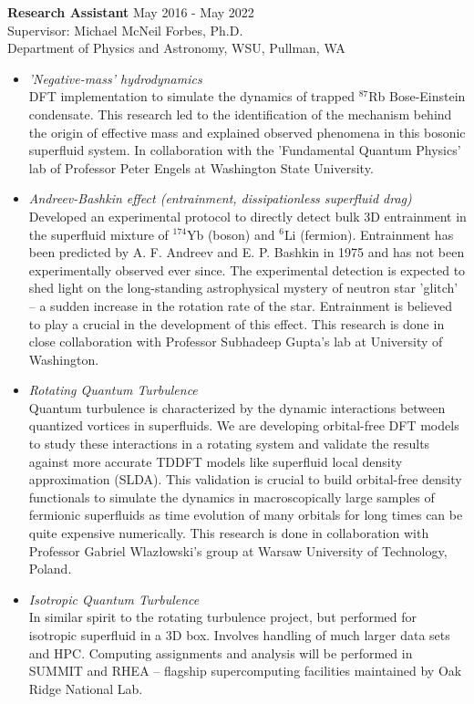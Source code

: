 \documentclass[10pt,fleqn]{scrartcl}
\begin{document}
\noindent
\textbf{Research Assistant}   \hfill May 2016 - May 2022 \\ 
Supervisor: Michael McNeil Forbes, Ph.D. \\
Department of Physics and Astronomy, WSU, Pullman, WA
\begin{itemize}
  \item \textit{'Negative-mass' hydrodynamics}\\
  		DFT implementation to simulate the dynamics of trapped $^{87}$Rb 
        Bose-Einstein condensate. This research led to the identification of 
        the mechanism behind the origin of effective mass and explained 
        observed phenomena in this bosonic superfluid system. In collaboration 
        with the 'Fundamental Quantum Physics' lab of Professor Peter Engels 
        at Washington State University. 
  \item \textit{Andreev-Bashkin effect (entrainment, dissipationless 
    superfluid drag)}\\
  		Developed an experimental protocol to directly detect bulk 3D 
        entrainment in the superfluid mixture of $^{174}$Yb (boson) and 
        $^{6}$Li (fermion). Entrainment has been predicted by A. F. Andreev 
        and E. P. Bashkin in 1975 and has not been experimentally observed ever 
        since. The experimental detection is expected to shed light on the 
        long-standing astrophysical mystery of neutron star 'glitch' -- 
        a sudden increase in the rotation rate of the star. Entrainment is 
        believed to play a crucial in the development of this effect. 
        This research is done in close collaboration with Professor Subhadeep 
        Gupta's lab at University of Washington.
  \item \textit{Rotating Quantum Turbulence}\\
  		Quantum turbulence is characterized by the dynamic interactions between 
        quantized vortices in superfluids. We are developing orbital-free DFT 
        models to study these interactions in a rotating system and validate 
        the results against more accurate TDDFT models like superfluid local 
        density approximation (SLDA). This validation is crucial to build 
        orbital-free density functionals to simulate the dynamics in 
        macroscopically large samples of fermionic superfluids as time 
        evolution of many orbitals for long times can be quite expensive 
        numerically. This research is done in collaboration with Professor 
        Gabriel Wlazłowski's group at Warsaw University of Technology, Poland.
  	\item \textit{Isotropic Quantum Turbulence}\\
  		In similar spirit to the rotating turbulence project, but performed for 
        isotropic  superfluid in a 3D box. Involves handling of much larger 
        data sets and HPC. Computing assignments and analysis will be performed 
        in SUMMIT and RHEA -- flagship supercomputing facilities maintained by 
        Oak Ridge National Lab. 
\end{itemize}
\end{document}

